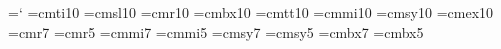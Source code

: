 =`\- %
\font\tenit@=cmti10 %
\font\tensl@=cmsl10 %
\font\tenrm@=cmr10 %
\font\tenbf@=cmbx10 %
\font\tentt@=cmtt10 %
\font\teni@=cmmi10 %
\font\tensy@=cmsy10 %
\font\tenex@=cmex10 %
\font\sevenrm@=cmr7 %
\font\fiverm@=cmr5 %
\font\seveni@=cmmi7 %
\font\fivei@=cmmi5 %
\font\sevensy@=cmsy7 %
\font\fivesy@=cmsy5 %
\font\sevenbf@=cmbx7 %
\font\fivebf@=cmbx5 %

\long{}
\long{}
\long{}
\long{}
\long{}

\def\alinhaesquerda{\rightskip 0em plus 2em \leftskip 0pt \spaceskip.3333em%
     \xspaceskip.5em\relax}
\def\alinhadireita{\leftskip 0em plus 2em \rightskip0pt \spaceskip.3333em%
     \xspaceskip.5em\relax}
\def\alinhacentro{\rightskip 0em plus 2em \leftskip 0em plus 2em%
                  \spaceskip.3333em \xspaceskip.5em\relax}
\def\alinhanormal{\leftskip0pt\rightskip0pt\spaceskip0pt\xspaceskip0pt\relax}

\nonstopmode

\def\maiusculo{\uppercase}
\def\minusculo{\lowercase}

\def\ano{\the\year}
\def\mes{\the\month}
\def\dia{\the\day}

\def\insere#1{}

\def\pagina{\the\pageno@}

\def\linha{{\hrule}}

